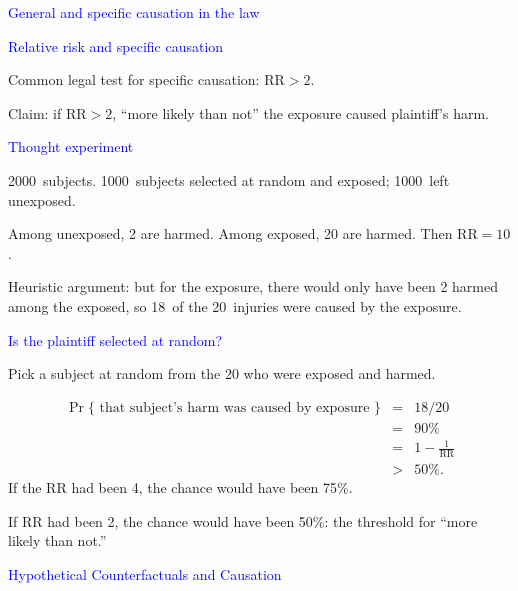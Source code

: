 \documentclass[landscape]{slides}
\newcommand{\RR}{{\mbox{RR}}}
\begin{document}
\begin{slide}
\begin{slide}{\textcolor{blue}{General and specific causation in the law}}
\end{slide}

\begin{slide}{\textcolor{blue}{Relative risk and specific causation}}

Common legal test for specific causation: $\RR > 2$.

Claim: if $\RR > 2$, ``more likely than not'' the exposure caused plaintiff's harm.

\end{slide}

\begin{slide}{\textcolor{blue}{Thought experiment}}

2000~subjects. 1000~subjects selected at random and exposed; 
1000~left unexposed. 

Among unexposed, 2 are harmed.  Among exposed, 20 are harmed. Then $\RR = 10$.

Heuristic argument: but for the exposure, there would only have been 
2 harmed among the exposed, so
18~of the 20~injuries were caused by the exposure.

\end{slide}

\begin{slide}{\textcolor{blue}{Is the plaintiff selected at random?}}

Pick a subject at random from the 20 who were exposed and harmed.

\begin{eqnarray*}
    \Pr \{ \mbox{ that subject's harm was caused by exposure } \} & = & 18/20 \\
    & = & 90\% \\
    &= & 1 - \frac{1}{\RR}  \\
    & > & 50\%.
\end{eqnarray*}
If the RR had been 4, the chance would have been 75\%.

If RR had been 2, the chance would have been 50\%: 
the threshold for ``more likely than not.''


\end{slide}

\begin{slide}{\textcolor{blue}{Hypothetical Counterfactuals and Causation}}


\end{slide}
\end{slide}
\end{document}
